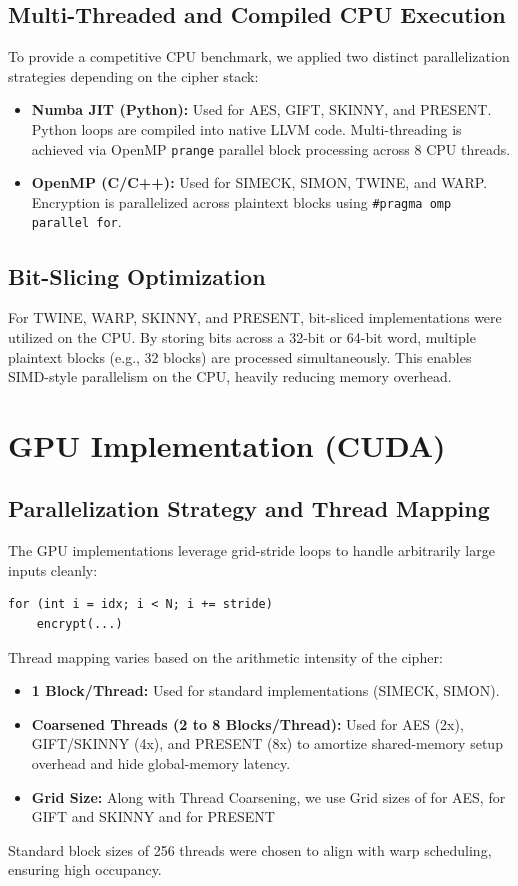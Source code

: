 \documentclass{article}
\begin{document}
\subsection{Multi-Threaded and Compiled CPU Execution}
To provide a competitive CPU benchmark, we applied two distinct parallelization strategies depending on the cipher stack:
\begin{itemize}
    \item \textbf{Numba JIT (Python):} Used for AES, GIFT, SKINNY, and PRESENT. Python loops are compiled into native LLVM code. Multi-threading is achieved via OpenMP \texttt{prange} parallel block processing across 8 CPU threads.
    \item \textbf{OpenMP (C/C++):} Used for SIMECK, SIMON, TWINE, and WARP. Encryption is parallelized across plaintext blocks using \texttt{\#pragma omp parallel for}.
\end{itemize}

\subsection{Bit-Slicing Optimization}
For TWINE, WARP, SKINNY, and PRESENT, bit-sliced implementations were utilized on the CPU. By storing bits across a 32-bit or 64-bit word, multiple plaintext blocks (e.g., 32 blocks) are processed simultaneously. This enables SIMD-style parallelism on the CPU, heavily reducing memory overhead.

\section{GPU Implementation (CUDA)}

\subsection{Parallelization Strategy and Thread Mapping}
The GPU implementations leverage grid-stride loops to handle arbitrarily large inputs cleanly:
\begin{verbatim}
for (int i = idx; i < N; i += stride)
    encrypt(...)
\end{verbatim}

Thread mapping varies based on the arithmetic intensity of the cipher:
\begin{itemize}
    \item \textbf{1 Block/Thread:} Used for standard implementations (SIMECK, SIMON).
    \item \textbf{Coarsened Threads (2 to 8 Blocks/Thread):} Used for AES (2x), GIFT/SKINNY (4x), and PRESENT (8x) to amortize shared-memory setup overhead and hide global-memory latency.
    \item \textbf{Grid Size:} Along with Thread Coarsening, we use Grid sizes of  for AES,  for GIFT and SKINNY and  for PRESENT 
\end{itemize}
Standard block sizes of 256 threads were chosen to align with warp scheduling, ensuring high occupancy.
\end{document}
